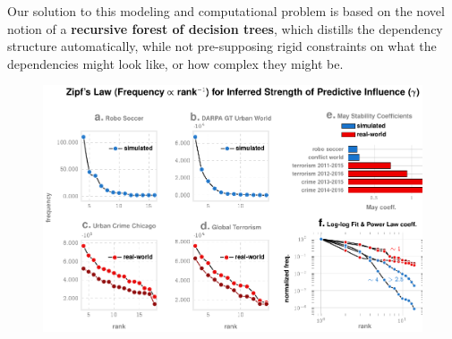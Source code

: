 \documentclass[onecolumn, compsoc,11pt]{IEEEtran}
\newif\iftikzX
\begin{document}
Our solution to this modeling and computational problem is based on the novel notion of a    \textbf{recursive forest of decision trees}, which  distills the dependency structure automatically, while not pre-supposing rigid constraints on what the dependencies might look like, or how complex they might be.
\begin{figure}
  \vspace{-10pt}
\iftikzX
    \hspace{-25pt}
    
      \vspace{-38pt}

\else
    \hspace{-25pt}
\includegraphics[width=1.02\textwidth]{Figures/External/main-figure0}
      \vspace{-25pt}

  \fi


\end{figure}
\end{document}
